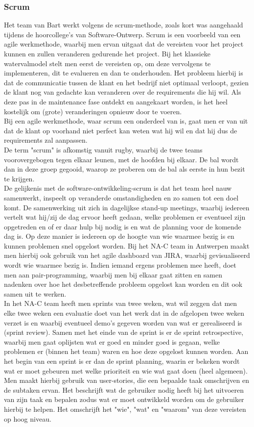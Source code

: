 \documentclass[10pt,a4paper]{article}
\begin{document}
\subsubsection{Scrum}
Het team van Bart werkt volgens de scrum-methode, zoals kort was aangehaald tijdens de hoorcollege's van Software-Ontwerp. Scrum is een voorbeeld van een agile werkmethode, waarbij men ervan uitgaat dat de vereisten voor het project kunnen en zullen veranderen gedurende het project. Bij het klassieke watervalmodel stelt men eerst de vereisten op, om deze vervolgens te implementeren, dit te evalueren en dan te onderhouden. Het probleem hierbij is dat de communicatie tussen de klant en het bedrijf 
niet optimaal verloopt, gezien de klant nog van gedachte kan veranderen over de requirements die hij wil. Als deze pas in de maintenance fase ontdekt en aangekaart worden, is het heel kostelijk om (grote) veranderingen opnieuw door te voeren.\\
Bij een agile werkmethode, waar scrum een onderdeel van is, gaat men er van uit dat de klant op voorhand niet perfect kan weten wat hij wil en dat hij dus de requirements zal aanpassen.\\
De term "scrum" is afkomstig vanuit rugby, waarbij de twee teams voorovergebogen tegen elkaar leunen, met de hoofden bij elkaar. De bal wordt dan in deze groep gegooid, waarop ze proberen om de bal als eerste in hun bezit te krijgen.\\
De gelijkenis met de software-ontwikkeling-scrum is dat het team heel nauw samenwerkt, inspeelt op veranderde omstandigheden en zo samen tot een doel komt. De samenwerking uit zich in dagelijkse stand-up meetings, waarbij iedereen vertelt wat hij/zij de dag ervoor heeft gedaan, welke problemen er eventueel zijn opgetreden en of er daar hulp bij nodig is en wat de planning voor de komende dag is. Op deze manier is iedereen op de hoogte van wie waarmee bezig is en kunnen problemen snel opgelost worden. Bij het NA-C team in Antwerpen maakt men hierbij ook gebruik van het agile dashboard van JIRA, waarbij gevisualiseerd wordt wie waarmee bezig is.  Indien iemand ergens problemen mee heeft, doet men aan pair-programming, waarbij men bij elkaar gaat zitten en samen nadenken over hoe het desbetreffende probleem opgelost kan worden en dit ook samen uit te werken.\\
In het NA-C team heeft men sprints van twee weken, wat wil zeggen dat men elke twee weken een evaluatie doet van het werk dat in de afgelopen twee weken verzet is en waarbij eventueel demo's gegeven worden van wat er gerealiseerd is (sprint review). Samen met het einde van de sprint is er de sprint retrospective, waarbij men gaat oplijsten wat er goed en minder goed is gegaan, welke problemen er (binnen het team) waren en hoe deze opgelost kunnen worden. Aan het begin van een sprint is er dan de sprint planning, waarin er bekeken wordt wat er moet gebeuren met welke prioriteit en wie wat gaat doen (heel algemeen). Men maakt hierbij gebruik van user-stories, die een bepaalde taak omschrijven en de subtaken ervan. Het beschrijft wat de gebruiker nodig heeft bij het uitvoeren van zijn taak en bepalen zodus wat er moet ontwikkeld worden om de gebruiker hierbij te helpen. Het omschrijft het "wie", "wat" en "waarom" van deze vereisten op hoog niveau.
\end{document}

